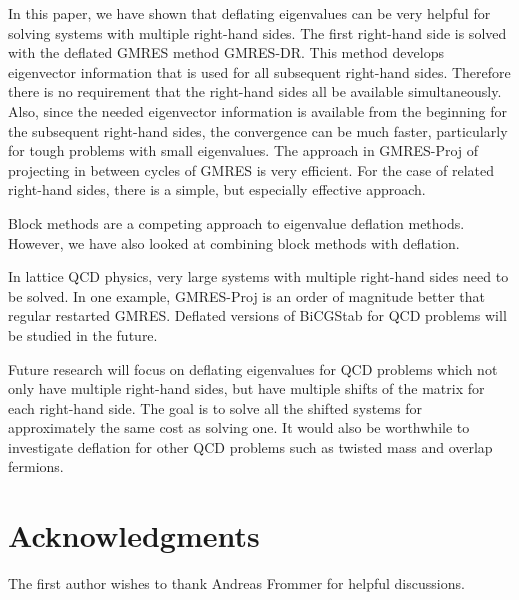 \documentclass[final]{siamltex}
\begin{document}
In this paper, we have shown that deflating eigenvalues can be very helpful for solving systems with multiple right-hand sides.  The first right-hand side is solved with the deflated GMRES method GMRES-DR.  This method develops eigenvector information that is used for all subsequent right-hand sides.  Therefore there is no requirement that the right-hand sides all be available simultaneously.  Also, since the needed eigenvector information is available from the beginning for the subsequent right-hand sides, the convergence can be much faster, particularly for tough problems with small eigenvalues.  The approach in GMRES-Proj of projecting in between cycles of GMRES is very efficient.  For the case of related right-hand sides, there is a simple, but especially effective approach.

Block methods are a competing approach to eigenvalue deflation methods.  However, we have also looked at combining block methods with deflation.

In lattice QCD physics, very large systems with multiple right-hand sides need to be solved.  In one example, GMRES-Proj is an order of magnitude better that regular restarted GMRES.  Deflated versions of BiCGStab for QCD problems will be studied in the future.  

Future research will focus on deflating eigenvalues for QCD problems which not only have multiple right-hand sides, but have multiple shifts of the matrix for each right-hand side.  The goal is to solve all the shifted systems for approximately the same cost as solving one.  It would also be worthwhile to investigate deflation for other QCD problems such as twisted mass and overlap fermions.

\section*{Acknowledgments} The first author wishes to thank Andreas Frommer for helpful discussions. 


\end{document}

